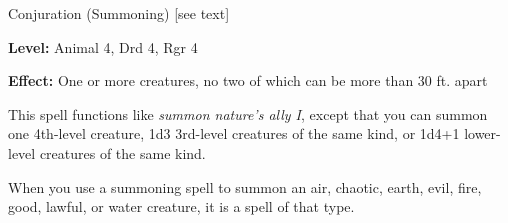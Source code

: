 
Conjuration (Summoning) [see text]

\textbf{Level:} Animal 4, Drd 4, Rgr 4

\textbf{Effect:} One or more creatures, no two of which can be more than 30 ft. 
apart

This spell functions like \textit{summon nature's ally I}, except that you can 
summon one 4th-level creature, 1d3 3rd-level creatures of the same kind, or 1d4+1 
lower-level creatures of the same kind.

When you use a summoning spell to summon an air, chaotic, earth, evil, fire, good, 
lawful, or water creature, it is a spell of that type.

